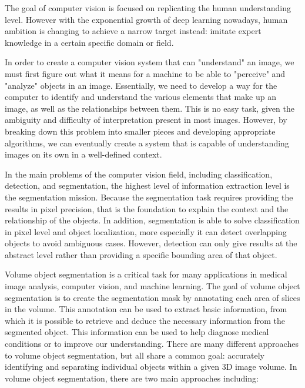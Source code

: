 The goal of computer vision is focused on replicating the human understanding level. However with the exponential growth of deep learning nowadays, human ambition is changing to achieve a narrow target instead: imitate expert knowledge in a certain specific domain or field.

In order to create a computer vision system that can "understand" an image, we must first figure out what it means for a machine to be able to "perceive" and "analyze" objects in an image. Essentially, we need to develop a way for the computer to identify and understand the various elements that make up an image, as well as the relationships between them. This is no easy task, given the ambiguity and difficulty of interpretation present in most images. However, by breaking down this problem into smaller pieces and developing appropriate algorithms, we can eventually create a system that is capable of understanding images on its own in a well-defined context.

In the main problems of the computer vision field, including classification, detection, and segmentation, the highest level of information extraction level is the segmentation mission. Because the segmentation task requires providing the results in pixel precision, that is the foundation to explain the context and the relationship of the objects. In addition, segmentation is able to solve classification in pixel level and object localization, more especially it can detect overlapping objects to avoid ambiguous cases. However, detection can only give results at the abstract level rather than providing a specific bounding area of that object.

Volume object segmentation is a critical task for many applications in medical image analysis, computer vision, and machine learning. The goal of volume object segmentation is to create the segmentation mask by annotating each area of slices in the volume. This annotation can be used to extract basic information, from which it is possible to retrieve and deduce the necessary information from the segmented object. This information can be used to help diagnose medical conditions or to improve our understanding. There are many different approaches to volume object segmentation, but all share a common goal: accurately identifying and separating individual objects within a given 3D image volume. In volume object segmentation, there are two main approaches including:

